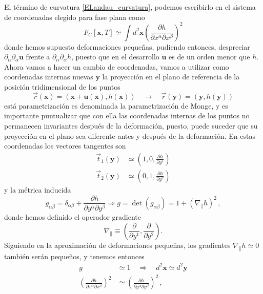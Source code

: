 El término de curvatura \eqref{ELandau_curvatura}, podemos escribirlo en el sistema de coordenadas
elegido para fase plana como
\begin{equation}\label{ELandau_curvatura_aprox}
F_C[\mathbf{x},T]\simeq\int d^2\mathbf{x} \left(\frac{\partial h}{\partial
  x^{\alpha} \partial x^{\beta}}\right)^2
\end{equation}
donde hemos supuesto deformaciones pequeñas, pudiendo entonces, despreciar
$\partial_{\alpha}\partial_{\alpha} \mathbf{u}$ frente a
$\partial_{\alpha}\partial_{\alpha} h$, puesto que en el desarrollo
$\mathbf{u}$ es de un orden menor que $h$. Ahora vamos a hacer un cambio de
coordenadas, vamos a utilizar como coordenadas internas nuevas $\mathbf{y}$ la proyección
en el plano de referencia de la posición tridimensional de los puntos
\begin{equation}
\vec{r}(\mathbf{x})=(\mathbf{x}+\mathbf{u(\mathbf{x})},h(\mathbf{x}))\quad
\rightarrow \quad \vec{r}(\mathbf{y})=(\mathbf{y},h(\mathbf{y}))
\end{equation}
está parametrización es denominada la parametrización de Monge, y es
importante puntualizar que con ella las coordenadas internas de los puntos no
permanecen invariantes después de la deformación, puesto, puede suceder que su
proyección en el plano sea diferente antes y después de la deformación. En
estas coordenadas los vectores tangentes son
\begin{align}
 \vec{t}_1(\mathbf{y})&\simeq\left(1,0,\frac{\partial h}{\partial y^1}\right)\\
 \vec{t}_2(\mathbf{y})&\simeq\left(0,1,\frac{\partial h}{\partial y^2}\right)
\end{align}
y la métrica inducida
\begin{equation}
g_{\alpha\beta}=\delta_{\alpha\beta}+\frac{\partial h}{\partial
  y^{\alpha} \partial y^{\beta}}\Rightarrow g=\det
(g_{\alpha\beta})=1+\left(\nabla_{\|} h\right)^2\, ,
\end{equation}
donde hemos definido el operador gradiente 
\begin{equation*}
\nabla_{\|}\equiv \left(\frac{\partial }{\partial y^1},\frac{\partial }{\partial y^2}\right).
\end{equation*}
Siguiendo en la aproximación de deformaciones pequeñas, los gradientes
$\nabla_{\|} h\simeq 0$ también serán pequeños, y tenemos entonces
\begin{align}
g&\simeq 1\quad\Rightarrow\quad d^2\mathbf{x}\simeq d^2\mathbf{y}\\
\left(\frac{\partial h}{\partial
  x^{\alpha} \partial x^{\beta}}\right)^2&\simeq \left(\frac{\partial h}{\partial
  y^{\alpha} \partial y^{\beta}}\right)^2\, ,
\end{align}
